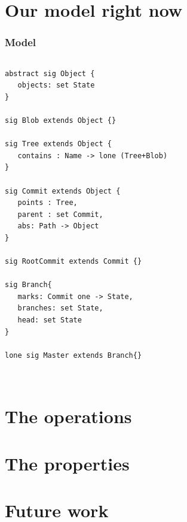 \documentclass{beamer}
\begin{document}

\section{Our model right now}
\begin{frame}[fragile]
   \frametitle{Model}
   \tiny
   \begin{columns}[c]
      \column{1.5in}
         \begin{lstlisting}
abstract sig Object {
   objects: set State
}

sig Blob extends Object {}

sig Tree extends Object {
   contains : Name -> lone (Tree+Blob)
}

sig Commit extends Object {
   points : Tree,
   parent : set Commit,
   abs: Path -> Object
}

sig RootCommit extends Commit {}

sig Branch{
   marks: Commit one -> State,
   branches: set State,
   head: set State
}

lone sig Master extends Branch{}
                  
         \end{lstlisting}
      \column{1.5in}
   \end{columns}
\end{frame}


\section{The operations}


\section{The properties}
\section{Future work}

\frame{
   \titlepage
}
\end{document}
